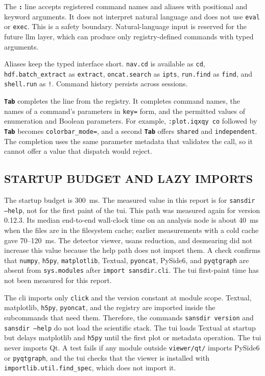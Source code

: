\documentclass[tm]{ornltm}
\newcommand{\cmd}[1]{\texttt{#1}}
\newcommand{\key}[1]{\textbf{\texttt{#1}}}
\begin{document}
The \key{:} line accepts registered command names and aliases with positional
and keyword arguments. It does not interpret natural language and does not use
\texttt{eval} or \texttt{exec}. This is a safety boundary. Natural-language
input is reserved for the future \ac{llm} layer, which can produce only
registry-defined commands with typed arguments.

Aliases keep the typed interface short. \cmd{nav.cd} is available as
\texttt{cd}, \cmd{hdf.batch\_extract} as \texttt{extract},
\cmd{oncat.search} as \texttt{ipts}, \cmd{run.find} as \texttt{find}, and
\cmd{shell.run} as \texttt{!}. Command history persists across sessions.

\key{Tab} completes the line from the registry. It completes command names, the
names of a command's parameters in \texttt{key=} form, and the permitted values
of enumeration and Boolean parameters. For example, \texttt{:plot.iqxqy co}
followed by \key{Tab} becomes \texttt{colorbar\_mode=}, and a second \key{Tab}
offers \texttt{shared} and \texttt{independent}. The completion uses the same
parameter metadata that validates the call, so it cannot offer a value that
dispatch would reject.

\subsection{STARTUP BUDGET AND LAZY IMPORTS}
\label{sec:startup}

The startup budget is 300~ms. The measured value in this report is for
\texttt{sansdir --help}, not for the first paint of the \ac{tui}. This path was
measured again for version 0.12.3. Its median end-to-end wall-clock time on an
analysis node is about 40~ms when the files are in the filesystem cache; earlier
measurements with a cold cache gave 70--120~ms. The detector viewer, \ac{usans}
reduction, and desmearing did not increase this value because the help path
does not import them. A check confirms that \texttt{numpy}, \texttt{h5py},
\texttt{matplotlib}, Textual, \texttt{pyoncat}, PySide6, and \texttt{pyqtgraph}
are absent from \texttt{sys.modules} after \texttt{import sansdir.cli}. The
\ac{tui} first-paint time has not been measured for this report.

The \ac{cli} imports only \texttt{click} and the version constant at module
scope. Textual, matplotlib, \texttt{h5py}, \texttt{pyoncat}, and the registry are
imported inside the subcommands that need them. Therefore, the commands
\texttt{sansdir version} and \texttt{sansdir --help} do not load the scientific
stack. The \ac{tui} loads Textual at startup but delays matplotlib and
\texttt{h5py} until the first plot or metadata operation. The \ac{tui} never
imports Qt. A test fails if any module outside \texttt{viewer/qt/} imports
PySide6 or \texttt{pyqtgraph}, and the \ac{tui} checks that the viewer is
installed with \texttt{importlib.util.find\_spec}, which does not import it.
\end{document}
